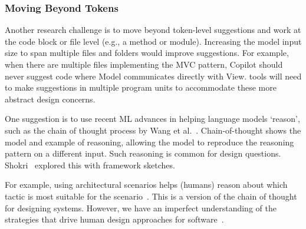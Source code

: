 \subsubsection{Moving Beyond Tokens}
\label{tokens}
Another research challenge is to move beyond token-level suggestions and work at the code block or file level (e.g., a method or module). 
Increasing the model input size to span multiple files and folders would improve suggestions. For example, when there are multiple files implementing the MVC pattern, Copilot should never suggest code where \textsf{Model} communicates directly with \textsf{View}. 
\AISE{} tools will need to make suggestions in multiple program units to accommodate these more abstract design concerns.

One suggestion is to use recent ML advances in helping language models `reason', such as the chain of thought process by Wang et al.~\cite{chain_of_thought}. 
Chain-of-thought shows the model and example of reasoning, allowing the model to reproduce the reasoning pattern on a different input.
Such reasoning is common for design questions. 
Shokri~\cite{shokri21} explored this with framework sketches.

For example, using architectural scenarios helps (humans) reason about which tactic is most suitable for the scenario~\cite{kazman98}. This is a version of the chain of thought for designing systems. 
However, we have an imperfect understanding of the strategies that drive human design approaches for software~\cite{Arab2022}. 